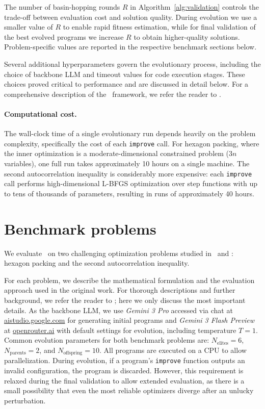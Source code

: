 \documentclass[sigconf]{acmart}
\begin{document}
The number of basin-hopping rounds $R$ in Algorithm~\ref{alg:validation} controls the trade-off between evaluation cost and solution quality. During evolution we use a smaller value of $R$ to enable rapid fitness estimation, while for final validation of the best evolved programs we increase $R$ to obtain higher-quality solutions. Problem-specific values are reported in the respective benchmark sections below.

Several additional hyperparameters govern the evolutionary process, including the choice of backbone LLM and timeout values for code execution stages. These choices proved critical to performance and are discussed in detail below. For a comprehensive description of the \gigaevo\ framework, we refer the reader to \cite{khrulkov2025gigaevo}.

\paragraph{Computational cost.}
The wall-clock time of a single evolutionary run depends heavily on the problem complexity, specifically the cost of each \texttt{improve} call. For hexagon packing, where the inner optimization is a moderate-dimensional constrained problem ($3n$ variables), one full run takes approximately 10 hours on a single machine. The second autocorrelation inequality is considerably more expensive: each \texttt{improve} call performs high-dimensional L-BFGS optimization over step functions with up to tens of thousands of parameters, resulting in runs of approximately 40 hours.

\section{Benchmark problems}
We evaluate \improvevolve\ on two challenging optimization problems studied in~\citet{novikov2025alphaevolve} and \citet{georgiev2025mathematical}: hexagon packing and the second autocorrelation inequality.

For each problem, we describe the mathematical formulation and the evaluation approach used in the original work. For thorough descriptions and further background, we refer the reader to \citet{georgiev2025mathematical}; here we only discuss the most important details. As the backbone LLM, we use \textit{Gemini 3 Pro} accessed via chat at \url{aistudio.google.com} for generating initial programs and \textit{Gemini 3 Flash Preview} at \url{openrouter.ai} with default settings for evolution, including temperature $T=1$. Common evolution parameters for both benchmark problems are: $N_{\text{elites}}=6$, $N_{\text{parents}}=2$, and $N_{\text{offspring}}=10$. All programs are executed on a CPU to allow parallelization. During evolution, if a program's \texttt{improve} function outputs an invalid configuration, the program is discarded. However, this requirement is relaxed during the final validation to allow extended evaluation, as there is a small possibility that even the most reliable optimizers diverge after an unlucky perturbation.
\end{document}
